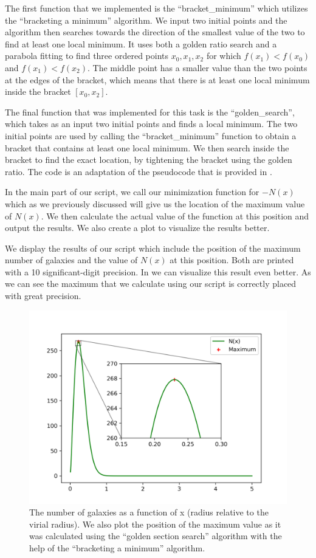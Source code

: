 \documentclass[a4paper,10pt]{article}
\begin{document}
The first function that we implemented is the ``bracket\_minimum'' which utilizes the ``bracketing a minimum'' algorithm. We input two initial points and the algorithm then searches towards the direction of the smallest value of the two to find at least one local minimum. It uses both a golden ratio search and a parabola fitting to find three ordered points $x_0,x_1,x_2$ for which $f(x_1)<f(x_0)$ and $f(x_1)<f(x_2)$. The middle point has a smaller value than the two points at the edges of the bracket, which means that there is at least one local minimum inside the bracket $[x_0,x_2]$.

The final function that was implemented for this task is the ``golden\_search'', which takes as an input two initial points and finds a local minimum. The two initial points are used by calling the ``bracket\_minimum'' function to obtain a bracket that contains at least one local minimum. We then search inside the bracket to find the exact location, by tightening the bracket using the golden ratio. The code is an adaptation of the pseudocode that is provided in .




In the main part of our script, we call our minimization function for $-N(x)$ which as we previously discussed will give us the location of the maximum value of $N(x)$. We then calculate the actual value of the function at this position and output the results. We also create a plot to visualize the results better.



We display the results of our script which include the position of the maximum number of galaxies and the value of $N(x)$ at this position. Both are printed with a 10 significant-digit precision. In  we can visualize this result even better. As we can see the maximum that we calculate using our script is correctly placed with great precision.

\begin{figure}[H]
  \centering
  \includegraphics[width=.8\linewidth]{./plots/maximization.png}
  \caption{The number of galaxies as a function of x (radius relative to the virial radius). We also plot the position of the maximum value as it was calculated using the ``golden section search'' algorithm with the help of the ``bracketing a minimum'' algorithm.}
  \label{fig:max}
\end{figure}
\end{document}

